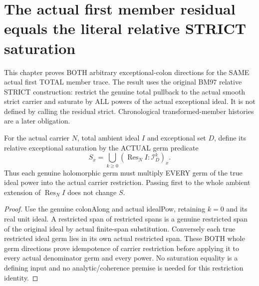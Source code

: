 \section{The actual first member residual equals the literal relative STRICT saturation}

This chapter proves BOTH arbitrary exceptional-colon directions for the
SAME actual first TOTAL member trace. The result uses the original BM97
relative STRICT construction: restrict the genuine total pullback to the
actual smooth strict carrier and saturate by ALL powers of the actual
exceptional ideal. It is not defined by calling the residual strict.
Chronological transformed-member histories are a later obligation.

\begin{definition}
\label{hir:sharp-actual-relative-exceptional-saturation}
\leanok
For the actual carrier $N$, total ambient ideal $I$ and exceptional set $D$,
define its relative exceptional saturation by the ACTUAL germ predicate
\[
 S_x=\bigcup_{k\ge0}(\operatorname{Res}_N I:\mathcal I_D^k)_x.
\]
Thus each genuine holomorphic germ must multiply EVERY germ of the true
ideal power into the actual carrier restriction. Passing first to the
whole ambient extension of $\operatorname{Res}_N I$ does not change $S$.
\end{definition}
\begin{proof}
Use the genuine colonAlong and actual idealPow, retaining $k=0$ and its real
unit ideal. A restricted span of restricted spans is a genuine restricted
span of the original ideal by actual finite-span substitution. Conversely
each true restricted ideal germ lies in its own actual restricted span.
These BOTH whole germ directions prove idempotence of carrier restriction
before applying it to every actual denominator germ and every power. No
saturation equality is a defining input and no analytic/coherence premise
is needed for this restriction identity.
\end{proof}


